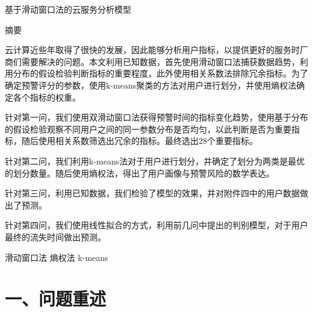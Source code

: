 \documentclass{my_paper}
\newcommand{\lunwenbiaoti}{\fontsize{15.75pt}{0}\heiti 基于滑动窗口法的云服务分析模型}
\newcommand{\zhaiyao}{\fontsize{14pt}{0}\heiti 摘要}
\begin{document}
\newpage
\begin{center}
\lunwenbiaoti

\vspace{2ex}
\zhaiyao
\end{center}

云计算近些年取得了很快的发展，因此能够分析用户指标，以提供更好的服务时厂商们需要解决的问题。本文利用已知数据，首先使用滑动窗口法捕获数据趋势，利用分布的假设检验判断指标的重要程度，此外使用相关系数法排除冗余指标。为了确定预警评分的参数，使用k-means聚类的方法对用户进行划分，并使用熵权法确定各个指标的权重。

针对第一问，我们使用双滑动窗口法获得预警时间的指标变化趋势，使用基于分布的假设检验观察不同用户之间的同一参数分布是否均匀，以此判断是否为重要指标，随后使用相关系数筛选出冗余的指标。最终选出28个重要指标。

针对第二问，我们利用k-means法对于用户进行划分，并确定了划分为两类是最优的划分数量。随后使用熵权法，得出了用户画像与预警风险的数学表达。

针对第三问，利用已知数据，我们检验了模型的效果，并对附件四中的用户数据做出了预测。

针对第四问，我们使用线性拟合的方式，利用前几问中提出的判别模型，对于用户最终的流失时间做出预测。

\begin{guanjianci}
 滑动窗口法 \quad 熵权法 \quad k-means
\end{guanjianci}

\newpage
\section{一、问题重述}
\end{document}

